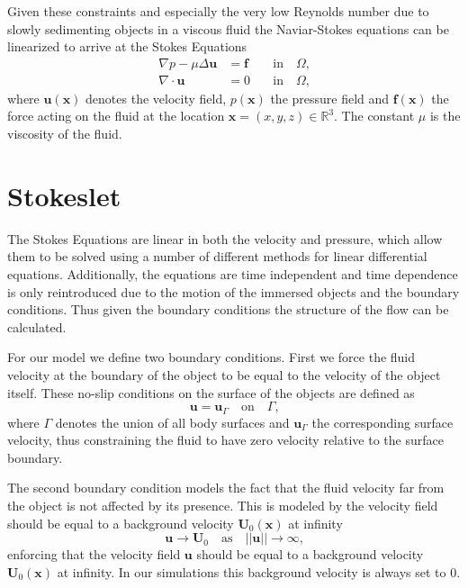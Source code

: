 \documentclass[a4paper,11pt]{kth-mag}
\begin{document}
Given these constraints and especially the very low Reynolds number due to slowly sedimenting objects in a viscous fluid the Naviar-Stokes equations can be linearized to arrive at the Stokes Equations
\begin{equation}
\label{eq:stokes_equations}
\begin{aligned}
    \nabla p - \mu \Delta \mathbf{u} &= \mathbf{f} \quad &\text{in} \quad \Omega \text{,}\\
    \nabla \cdot \mathbf{u} &= 0 \quad &\text{in} \quad \Omega \text{,}
\end{aligned}
\end{equation}
where $\mathbf{u}(\mathbf{x})$ denotes the velocity field, $p(\mathbf{x})$ the pressure field and $\mathbf{f}(\mathbf{x})$ the force acting on the fluid at the location $\mathbf{x} = (x,y,z) \in \mathbb{R}^3$. The constant $\mu$ is the viscosity of the fluid.

\section{Stokeslet}

The Stokes Equations are linear in both the velocity and pressure, which allow them to be solved using a number of different methods for linear differential equations. Additionally, the equations are time independent and time dependence is only reintroduced due to the motion of the immersed objects and the boundary conditions. Thus given the boundary conditions the structure of the flow can be calculated.

For our model we define two boundary conditions. First we force the fluid velocity at the boundary of the object to be equal to the velocity of the object itself. These no-slip conditions on the surface of the objects are defined as
\begin{equation}
  \label{eq:boundary_condition_surface}
  \mathbf{u} = \mathbf{u}_\Gamma  \quad \text{on} \quad  \Gamma \text{,}
\end{equation}
where $\Gamma$ denotes the union of all body surfaces and $\mathbf{u}_\Gamma$ the corresponding surface velocity, thus constraining the fluid to have zero velocity relative to the surface boundary.

The second boundary condition models the fact that the fluid velocity far from the object is not affected by its presence. This is modeled by the velocity field should be equal to a background velocity $\mathbf{U}_0(\mathbf{x})$ at infinity
\begin{equation}
  \label{eq:boundary_condition_background}
  \mathbf{u} \rightarrow \mathbf{U}_0 \quad \text{as} \quad ||\mathbf{u}|| \rightarrow \infty \text{,}
\end{equation}
enforcing that the velocity field $\mathbf{u}$ should be equal to a background velocity $\mathbf{U}_0(\mathbf{x})$ at infinity. In our simulations this background velocity is always set to $0$.
\end{document}
